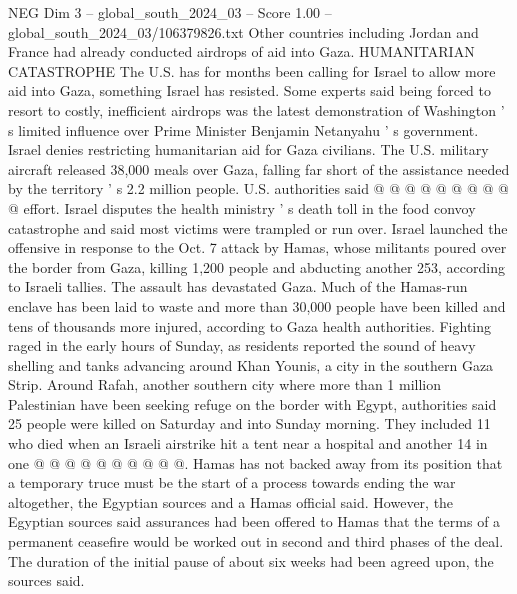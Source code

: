 \begin{textsample}{NEG Dim 3 – global\_south\_2024\_03 – Score 1.00 – global\_south\_2024\_03/106379826.txt}
Other countries including Jordan and France had already conducted airdrops of aid into Gaza.
HUMANITARIAN CATASTROPHE The U.S. has for months been calling for Israel to allow more aid into Gaza, something Israel has resisted.
Some experts said being forced to resort to costly, inefficient airdrops was the latest demonstration of Washington ' s limited influence over Prime Minister Benjamin Netanyahu ' s government.
Israel denies restricting humanitarian aid for Gaza civilians.
The U.S. military aircraft released 38,000 meals over Gaza, falling far short of the assistance needed by the territory ' s 2.2 million people.
U.S. authorities said @ @ @ @ @ @ @ @ @ @ effort.
Israel disputes the health ministry ' s death toll in the food convoy catastrophe and said most victims were trampled or run over.
Israel launched the offensive in response to the Oct. 7 attack by Hamas, whose militants poured over the border from Gaza, killing 1,200 people and abducting another 253, according to Israeli tallies.
The assault has devastated Gaza.
Much of the Hamas-run enclave has been laid to waste and more than 30,000 people have been killed and tens of thousands more injured, according to Gaza health authorities.
Fighting raged in the early hours of Sunday, as residents reported the sound of heavy shelling and tanks advancing around Khan Younis, a city in the southern Gaza Strip.
Around Rafah, another southern city where more than 1 million Palestinian have been seeking refuge on the border with Egypt, authorities said 25 people were killed on Saturday and into Sunday morning.
They included 11 who died when an Israeli airstrike hit a tent near a hospital and another 14 in one @ @ @ @ @ @ @ @ @ @.
Hamas has not backed away from its position that a temporary truce must be the start of a process towards ending the war altogether, the Egyptian sources and a Hamas official said.
However, the Egyptian sources said assurances had been offered to Hamas that the terms of a permanent ceasefire would be worked out in second and third phases of the deal.
The duration of the initial pause of about six weeks had been agreed upon, the sources said.

\end{textsample}
